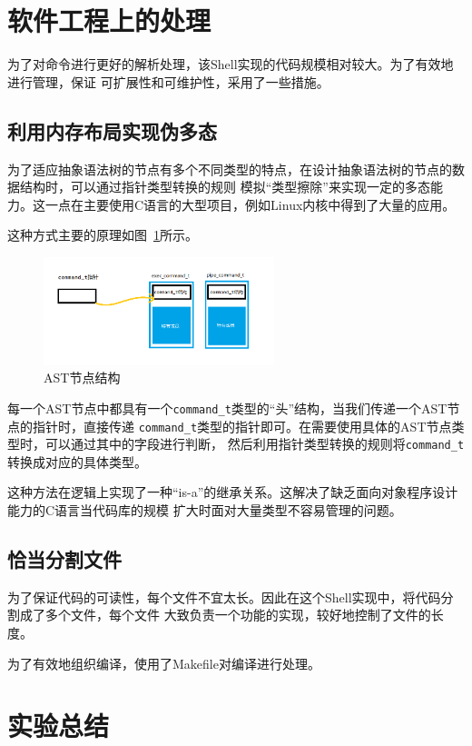 \documentclass[a4paper,twoside]{article}
\begin{document}
\begin{spacing}{1.2}
\section{软件工程上的处理}

为了对命令进行更好的解析处理，该Shell实现的代码规模相对较大。为了有效地进行管理，保证
可扩展性和可维护性，采用了一些措施。

\subsection{利用内存布局实现伪多态}

为了适应抽象语法树的节点有多个不同类型的特点，在设计抽象语法树的节点的数据结构时，可以通过指针类型转换的规则
模拟“类型擦除”来实现一定的多态能力。这一点在主要使用C语言的大型项目，例如Linux内核中得到了大量的应用。

这种方式主要的原理如图~\ref{fig:poly}所示。
\begin{figure}[ht]
	\centering
	\caption{AST节点结构}
	\label{fig:poly}
	\includegraphics[width=0.6\textwidth]{poly.png}
\end{figure}
每一个AST节点中都具有一个\texttt{command\_t}类型的“头”结构，当我们传递一个AST节点的指针时，直接传递
\texttt{command\_t}类型的指针即可。在需要使用具体的AST节点类型时，可以通过其中的字段进行判断，
然后利用指针类型转换的规则\cite{iso1999iso}将\texttt{command\_t}转换成对应的具体类型。

这种方法在逻辑上实现了一种“is-a”的继承关系。这解决了缺乏面向对象程序设计能力的C语言当代码库的规模
扩大时面对大量类型不容易管理的问题。

\subsection{恰当分割文件}

为了保证代码的可读性，每个文件不宜太长\cite{martin2009clean}。因此在这个Shell实现中，将代码分割成了多个文件，每个文件
大致负责一个功能的实现，较好地控制了文件的长度。

为了有效地组织编译，使用了Makefile对编译进行处理。

\section{实验总结}


\end{spacing}
\end{document}

